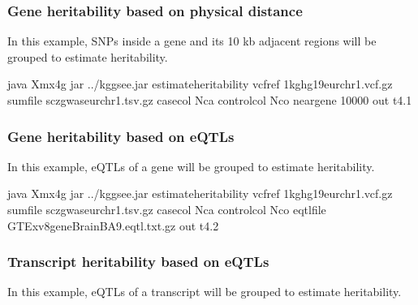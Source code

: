 \documentclass[letterpaper,10pt,english,openany,oneside]{sphinxmanual}
\begin{document}
\subsubsection{Gene heritability based on physical distance}
\label{\detokenize{detailed_document:gene-heritability-based-on-physical-distance}}
\sphinxAtStartPar
In this example, SNPs inside a gene and its 10 kb adjacent regions will be grouped to estimate heritability.

\begin{sphinxVerbatim}[commandchars=\\\{\}]
java \PYGZhy{}Xmx4g \PYGZhy{}jar ../kggsee.jar 
  \PYGZhy{}\PYGZhy{}estimate\PYGZhy{}heritability 
  \PYGZhy{}\PYGZhy{}vcf\PYGZhy{}ref 1kg\PYGZus{}hg19\PYGZus{}eur\PYGZus{}chr1.vcf.gz 
  \PYGZhy{}\PYGZhy{}sum\PYGZhy{}file scz\PYGZus{}gwas\PYGZus{}eur\PYGZus{}chr1.tsv.gz 
  \PYGZhy{}\PYGZhy{}case\PYGZhy{}col Nca 
  \PYGZhy{}\PYGZhy{}control\PYGZhy{}col Nco 
  \PYGZhy{}\PYGZhy{}neargene 10000 
  \PYGZhy{}\PYGZhy{}out t4.1
\end{sphinxVerbatim}


\subsubsection{Gene heritability based on eQTLs}
\label{\detokenize{detailed_document:gene-heritability-based-on-eqtls}}
\sphinxAtStartPar
In this example, eQTLs of a gene will be grouped to estimate heritability.

\begin{sphinxVerbatim}[commandchars=\\\{\}]
java \PYGZhy{}Xmx4g \PYGZhy{}jar ../kggsee.jar 
  \PYGZhy{}\PYGZhy{}estimate\PYGZhy{}heritability 
  \PYGZhy{}\PYGZhy{}vcf\PYGZhy{}ref 1kg\PYGZus{}hg19\PYGZus{}eur\PYGZus{}chr1.vcf.gz 
  \PYGZhy{}\PYGZhy{}sum\PYGZhy{}file scz\PYGZus{}gwas\PYGZus{}eur\PYGZus{}chr1.tsv.gz 
  \PYGZhy{}\PYGZhy{}case\PYGZhy{}col Nca 
  \PYGZhy{}\PYGZhy{}control\PYGZhy{}col Nco 
  \PYGZhy{}\PYGZhy{}eqtl\PYGZhy{}file GTEx\PYGZus{}v8\PYGZus{}gene\PYGZus{}BrainBA9.eqtl.txt.gz 
  \PYGZhy{}\PYGZhy{}out t4.2
\end{sphinxVerbatim}


\subsubsection{Transcript heritability based on eQTLs}
\label{\detokenize{detailed_document:transcript-heritability-based-on-eqtls}}
\sphinxAtStartPar
In this example, eQTLs of a transcript will be grouped to estimate heritability.
\end{document}
